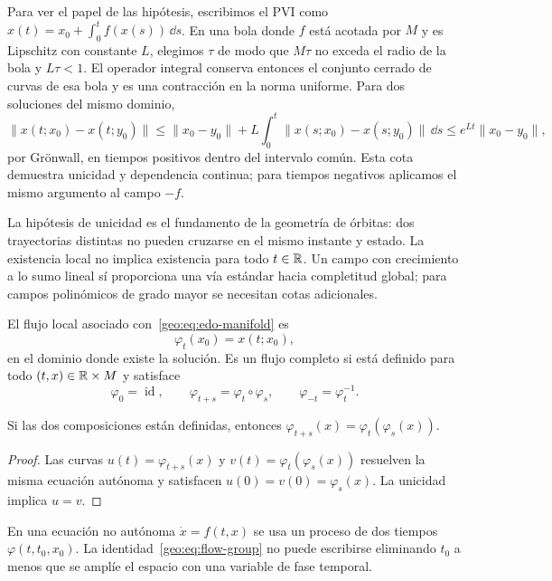 Para ver el papel de las hipótesis, escribimos el PVI como
\(x(t)=x_0+\int_0^tf(x(s))\,\dd s\). En una bola donde \(f\) está
acotada por \(M\) y es Lipschitz con constante \(L\), elegimos \(\tau\)
de modo que \(M\tau\) no exceda el radio de la bola y \(L\tau<1\).
El operador integral conserva entonces el conjunto cerrado de curvas de esa
bola y es una contracción en la norma uniforme. Para dos soluciones del
mismo dominio,
\[
 \|x(t;x_0)-x(t;y_0)\|
 \le\|x_0-y_0\|+L\int_0^t\|x(s;x_0)-x(s;y_0)\|\,\dd s
 \le e^{Lt}\|x_0-y_0\|,
\]
por Grönwall, en tiempos positivos dentro del intervalo común. Esta cota
demuestra unicidad y dependencia continua; para tiempos negativos aplicamos
el mismo argumento al campo \(-f\).

La hipótesis de unicidad es el fundamento de la geometría de órbitas: dos
trayectorias distintas no pueden cruzarse en el mismo instante y estado. La
existencia local no implica existencia para todo \(t\in\mathbb{R}\). Un campo con
crecimiento a lo sumo lineal sí proporciona una vía estándar hacia completitud
global; para campos polinómicos de grado mayor se necesitan cotas adicionales.

\begin{definition}
El flujo local asociado con~\eqref{geo:eq:edo-manifold} es
\begin{equation}
 \varphi_t(x_0)=x(t;x_0),
 \label{geo:eq:flow}
\end{equation}
en el dominio donde existe la solución. Es un flujo completo si está definido
para todo \((t,x)\in\mathbb{R}\times M\) y satisface
\begin{equation}
 \varphi_0=\operatorname{id},\qquad
 \varphi_{t+s}=\varphi_t\circ\varphi_s,
 \qquad \varphi_{-t}=\varphi_t^{-1}.
 \label{geo:eq:flow-group}
\end{equation}
\end{definition}

\begin{proposition}
Si las dos composiciones están definidas, entonces
\(\varphi_{t+s}(x)=\varphi_t(\varphi_s(x))\).
\end{proposition}

\begin{proof}
Las curvas \(u(t)=\varphi_{t+s}(x)\) y
\(v(t)=\varphi_t(\varphi_s(x))\) resuelven la misma ecuación autónoma y
satisfacen \(u(0)=v(0)=\varphi_s(x)\). La unicidad implica \(u=v\).
\end{proof}

\begin{remark}
En una ecuación no autónoma \(\dot x=f(t,x)\) se usa un proceso de dos tiempos
\(\varphi(t,t_0,x_0)\). La identidad~\eqref{geo:eq:flow-group} no puede
escribirse eliminando \(t_0\) a menos que se amplíe el espacio con una variable
de fase temporal.
\end{remark}


